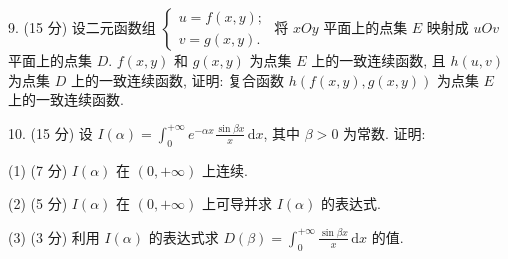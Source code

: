 \documentclass{examcollection}
\begin{document}
{\begin{minipage}{\textwidth}
9. (15 分) 设二元函数组 $\left\{ \begin{array}{l} u = f(x, y); \\ v = g(x, y). \end{array} \right.$ 将 $xOy$ 平面上的点集 $E$ 映射成 $uOv$ 平面上的点集 $D$. $f(x, y)$ 和 $g(x, y)$ 为点集 $E$ 上的一致连续函数, 且 $h(u, v)$ 为点集 $D$ 上的一致连续函数, 证明: 复合函数 $h(f(x, y), g(x, y))$ 为点集 $E$ 上的一致连续函数.\par
10. (15 分) 设 $I(\alpha) = \int_{0}^{+\infty} e^{-\alpha x} \frac{\sin \beta x}{x} \, \mathrm{d}x$, 其中 $\beta > 0$ 为常数. 证明:\par
(1) (7 分) $I(\alpha)$ 在 $(0, +\infty)$ 上连续.\par
(2) (5 分) $I(\alpha)$ 在 $(0, +\infty)$ 上可导并求 $I(\alpha)$ 的表达式.\par
(3) (3 分) 利用 $I(\alpha)$ 的表达式求 $D(\beta) = \int_{0}^{+\infty} \frac{\sin \beta x}{x} \, \mathrm{d}x$ 的值.\par
\end{minipage}}
\ifdim\dimexpr\ht\proofbox+\dp\proofbox\relax>\textheight
\noindent\resizebox{!}{\textheight}{\usebox{\proofbox}}\else\noindent\usebox{\proofbox}\fi\clearpage
\end{document}
